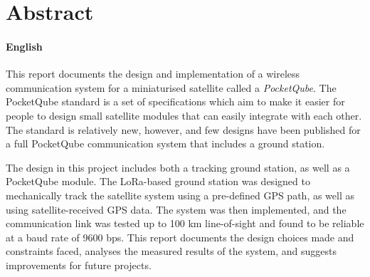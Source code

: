 \chapter*{Abstract}
\makeatletter{}\makeatother

\subsubsection*{English}

This report documents the design and implementation of a wireless communication system for a miniaturised satellite called a \textit{PocketQube}. The PocketQube standard is a set of specifications which aim to make it easier for people to design small satellite modules that can easily integrate with each other. The standard is relatively new, however, and few designs have been published for a full PocketQube communication system that includes a ground station.

The design in this project includes both a tracking ground station, as well as a PocketQube module. The LoRa-based ground station was designed to mechanically track the satellite system using a pre-defined GPS path, as well as using satellite-received GPS data. The system was then implemented, and the communication link was tested up to 100 km line-of-sight and found to be reliable at a baud rate of 9600 bps. This report documents the design choices made and constraints faced, analyses the measured results of the system, and suggests improvements for future projects.

